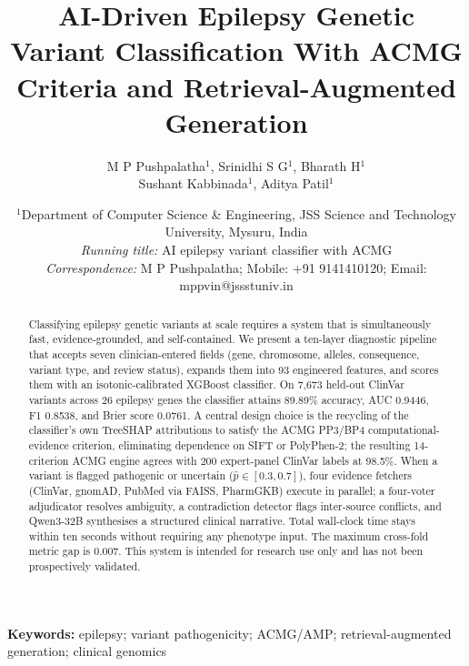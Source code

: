 \documentclass[12pt,a4paper]{article}
\begin{document}
\title{\textbf{AI-Driven Epilepsy Genetic Variant Classification With ACMG
       Criteria and Retrieval-Augmented Generation}}

\author{
  M P Pushpalatha$^{1}$,\quad
  Srinidhi S G$^{1}$,\quad
  Bharath H$^{1}$\\[4pt]
  Sushant Kabbinada$^{1}$,\quad
  Aditya Patil$^{1}$
}

\date{
  \normalsize
  $^{1}$Department of Computer Science \& Engineering,
  JSS Science and Technology University, Mysuru, India\\[6pt]
  \textit{Running title:} AI epilepsy variant classifier with ACMG\\[4pt]
  \textit{Correspondence:} M P Pushpalatha;
  Mobile: +91 9141410120;
  Email: mppvin@jssstuniv.in
}

\maketitle

\begin{abstract}
Classifying epilepsy genetic variants at scale requires a system
that is simultaneously fast, evidence-grounded, and self-contained.
We present a ten-layer diagnostic pipeline that accepts seven
clinician-entered fields (gene, chromosome, alleles, consequence,
variant type, and review status), expands them into 93 engineered
features, and scores them with an isotonic-calibrated XGBoost
classifier. On 7,673 held-out ClinVar variants across 26 epilepsy
genes the classifier attains 89.89\% accuracy, AUC 0.9446, F1
0.8538, and Brier score 0.0761. A central design choice is the
recycling of the classifier's own TreeSHAP attributions to satisfy
the ACMG PP3/BP4 computational-evidence criterion, eliminating
dependence on SIFT or PolyPhen-2; the resulting 14-criterion ACMG
engine agrees with 200 expert-panel ClinVar labels at 98.5\%.
When a variant is flagged pathogenic or uncertain
($\hat{p} \in [0.3, 0.7]$), four evidence fetchers (ClinVar,
gnomAD, PubMed via FAISS, PharmGKB) execute in parallel; a
four-voter adjudicator resolves ambiguity, a contradiction detector
flags inter-source conflicts, and Qwen3-32B synthesises a
structured clinical narrative. Total wall-clock time stays within
ten seconds without requiring any phenotype input. The maximum
cross-fold metric gap is 0.007. This system is intended for
research use only and has not been prospectively validated.
\end{abstract}

\medskip
\noindent\textbf{Keywords:} epilepsy; variant pathogenicity; ACMG/AMP;
retrieval-augmented generation; clinical genomics
\end{document}
